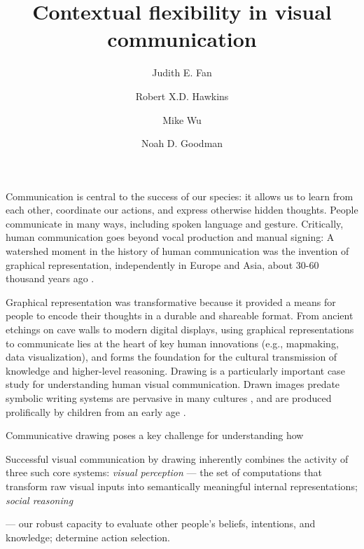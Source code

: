 \documentclass[9pt,twocolumn,twoside]{pnas-new}
\title{Contextual flexibility in visual communication}
\author[a,1]{Judith E. Fan}
\author[a]{Robert X.D. Hawkins}
\author[b]{Mike Wu}
\author[a,b]{Noah D. Goodman}
\affil[a]{Department of Psychology, Stanford University}
\affil[b]{Department of Computer Science, Stanford University}
\begin{document}
\verticaladjustment{-2pt}

\maketitle
\thispagestyle{firststyle}

Communication is central to the success of our species: it allows us to learn from each other, coordinate our actions, and express otherwise hidden thoughts. People communicate in many ways, including spoken language and gesture. Critically, human communication goes beyond vocal production and manual signing: A watershed moment in the history of human communication was the invention of graphical representation, independently in Europe and Asia, about 30-60 thousand years ago \cite{hoffmann2018u,Aubert:2014jy}.

Graphical representation was transformative because it provided a means for people to encode their thoughts in a durable and shareable format. From ancient etchings on cave walls to modern digital displays, using graphical representations to communicate lies at the heart of key human innovations (e.g., mapmaking, data visualization), and forms the foundation for the cultural transmission of knowledge and higher-level reasoning. Drawing is a particularly important case study for understanding human visual communication. Drawn images predate symbolic writing systems \cite{clottes2008cave} are pervasive in many cultures \cite{gombrich1989story}, and are produced prolifically by children from an early age \cite{kellogg1969analyzing}.


Communicative drawing poses a key challenge for understanding how

Successful visual communication by drawing inherently combines the activity of three such core systems: \textit{visual perception} --- the set of computations that transform raw visual inputs into semantically meaningful internal representations; \textit{social reasoning} 


--- our robust capacity to evaluate other people's beliefs, intentions, and knowledge; determine action selection.
\end{document}
